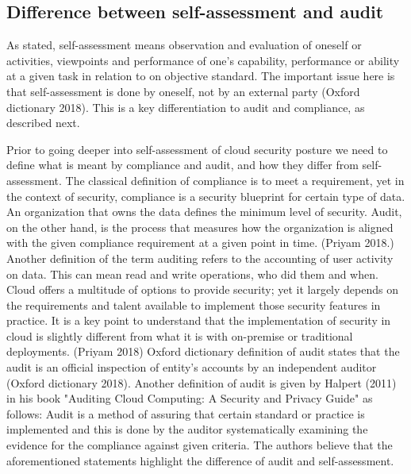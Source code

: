 \documentclass{article}
\begin{document}
\subsection{Difference between self-assessment and audit}
As stated, self-assessment means observation and evaluation of oneself or activities, viewpoints and performance of one's capability, performance or ability at a given task in relation to on objective standard. The important issue here is that self-assessment is done by oneself, not by an external party (Oxford dictionary 2018). This is a key differentiation to audit and compliance, as described next.
\par
Prior to going deeper into self-assessment of cloud security posture we need to define what is meant by compliance and audit, and how they differ from self-assessment.
The classical definition of compliance is to meet a requirement, yet in the context of security, compliance is a security blueprint for certain type of data. An organization that owns the data defines the minimum level of security.
Audit, on the other hand, is the process that measures how the organization is aligned with the given compliance requirement at a given point in time. (Priyam 2018.)
Another definition of the term auditing refers to the accounting of user activity on data. This can mean read and write operations, who did them and when.
Cloud offers a multitude of options to provide security; yet it largely depends on the requirements and talent available to implement those security features in practice. It is a key point to understand that the implementation of security in cloud is slightly different from what it is with on-premise or traditional deployments. (Priyam 2018)
Oxford dictionary definition of audit states that the audit is an official inspection of entity's accounts by an independent auditor (Oxford dictionary 2018). Another definition of audit is given by Halpert (2011) in his book "Auditing Cloud Computing: A Security and Privacy Guide" as follows: Audit is a method of assuring that certain standard or practice is implemented and this is done by the auditor systematically examining the evidence for the compliance against given criteria. The authors believe that the aforementioned statements highlight the difference of audit and self-assessment. 
\end{document}
